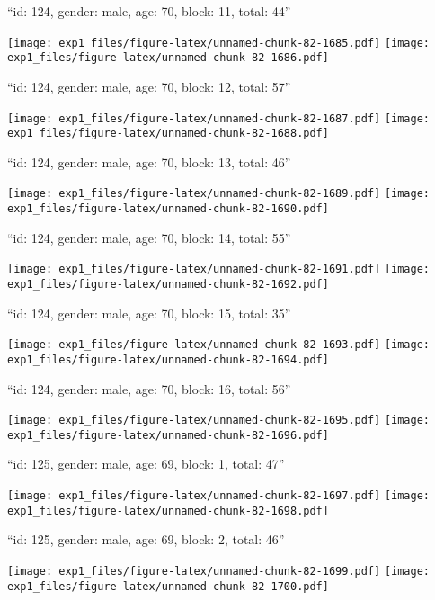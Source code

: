 \documentclass[11pt,,]{article}
\begin{document}
\newpage
[1] 

``id: 124, gender: male, age: 70, block: 11, total: 44''

\texttt{[image: exp1\_files/figure-latex/unnamed-chunk-82-1685.pdf]}
\texttt{[image: exp1\_files/figure-latex/unnamed-chunk-82-1686.pdf]}

\newpage
[1] 

``id: 124, gender: male, age: 70, block: 12, total: 57''

\texttt{[image: exp1\_files/figure-latex/unnamed-chunk-82-1687.pdf]}
\texttt{[image: exp1\_files/figure-latex/unnamed-chunk-82-1688.pdf]}

\newpage
[1] 

``id: 124, gender: male, age: 70, block: 13, total: 46''

\texttt{[image: exp1\_files/figure-latex/unnamed-chunk-82-1689.pdf]}
\texttt{[image: exp1\_files/figure-latex/unnamed-chunk-82-1690.pdf]}

\newpage
[1] 

``id: 124, gender: male, age: 70, block: 14, total: 55''

\texttt{[image: exp1\_files/figure-latex/unnamed-chunk-82-1691.pdf]}
\texttt{[image: exp1\_files/figure-latex/unnamed-chunk-82-1692.pdf]}

\newpage
[1] 

``id: 124, gender: male, age: 70, block: 15, total: 35''

\texttt{[image: exp1\_files/figure-latex/unnamed-chunk-82-1693.pdf]}
\texttt{[image: exp1\_files/figure-latex/unnamed-chunk-82-1694.pdf]}

\newpage
[1] 

``id: 124, gender: male, age: 70, block: 16, total: 56''

\texttt{[image: exp1\_files/figure-latex/unnamed-chunk-82-1695.pdf]}
\texttt{[image: exp1\_files/figure-latex/unnamed-chunk-82-1696.pdf]}

\newpage
[1] 

``id: 125, gender: male, age: 69, block: 1, total: 47''

\texttt{[image: exp1\_files/figure-latex/unnamed-chunk-82-1697.pdf]}
\texttt{[image: exp1\_files/figure-latex/unnamed-chunk-82-1698.pdf]}

\newpage
[1] 

``id: 125, gender: male, age: 69, block: 2, total: 46''

\texttt{[image: exp1\_files/figure-latex/unnamed-chunk-82-1699.pdf]}
\texttt{[image: exp1\_files/figure-latex/unnamed-chunk-82-1700.pdf]}
\end{document}

